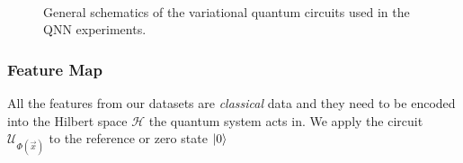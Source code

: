 \begin{figure}[!ht]
\begin{subfigure}{1.0\textwidth}
    	\label{subfigure:general_schematics_quantum_circuits_qnn}
    \end{subfigure}
    \\[3em]
    \begin{subfigure}{1.0\textwidth}
        \centering
    	\label{subfigure:general_layer_schematics_quantum_circuits_qnn}
    \end{subfigure}
    \caption{General schematics of the variational quantum circuits used in the QNN experiments.}
    \label{fig:general_schematics_quantum_circuits_qnn}
\end{figure}

\subsubsection{Feature Map}
All the features from our datasets are \textit{classical} data and they need to be encoded into the Hilbert space $\mathcal{H}$ the quantum system acts in. We apply the circuit $\mathcal{U}_{\Phi(\Vec{x})}$ to the reference or zero state $\ket{0}$

